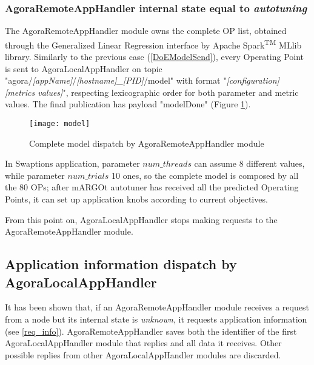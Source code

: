 \subsubsection{AgoraRemoteAppHandler internal state equal to \textit{autotuning}}\label{modelSend}

The AgoraRemoteAppHandler module owns the complete OP list, obtained through the Generalized Linear Regression interface by A\-pach\-e Spark\textsuperscript{TM} MLlib library. Similarly to the previous case (\ref{DoEModelSend}), every Operating Point is sent to AgoraLocalAppHandler on topic "agora\slash{}\textit{[app\-Name]}\slash{}\textit{[host\-name]\_[PID]}\slash{}model" with format "\textit{[configuration] [metrics values]}", respecting lexicographic order for both parameter and metric values. The final publication has payload "modelDone" (Figure \ref{fig:model}).

\begin{figure}[hb]

    \centering
    \texttt{[image: model]}
    \caption{Complete model dispatch by AgoraRemoteAppHandler module}
    \label{fig:model}
    
\end{figure}

In Swaptions application, parameter $num\_threads$ can assume 8 different values, while parameter $num\_trials$ 10 ones, so the complete model is composed by all the 80 OPs; after mARGOt autotuner has received all the predicted Operating Points, it can set up application knobs according to current objectives.

From this point on, AgoraLocalAppHandler stops making requests to the AgoraRemoteAppHandler module.





\subsection{Application information dispatch by AgoraLocalAppHandler}\label{client_info}

It has been shown that, if an AgoraRemoteAppHandler module receives a request from a node but its internal state is \textit{unknown}, it requests application information (see \ref{req_info}). AgoraRemoteAppHandler saves both the identifier of the first AgoraLocalAppHandler module that replies and all data it receives. Other possible replies from other AgoraLocalAppHandler modules are discarded.

